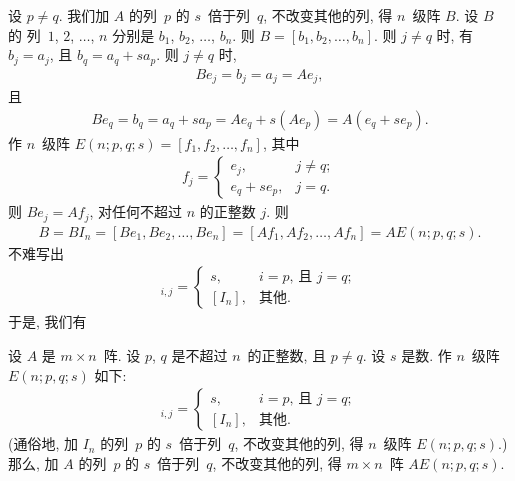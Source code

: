 设 \(p \neq q\).
我们加 \(A\) 的列~\(p\) 的 \(s\)~倍于列~\(q\),
不改变其他的列, 得 \(n\)~级阵 \(B\).
设 \(B\) 的%
列~\(1\), \(2\), \(\dots\), \(n\) 分别是
\(b_1\), \(b_2\), \(\dots\), \(b_n\).
则 \(B = [b_1, b_2, \dots, b_n]\).
则 \(j \neq q\) 时, 有 \(b_j = a_j\),
且 \(b_q = a_q + s a_p\).
则 \(j \neq q\) 时,
\begin{align*}
    B e_j = b_j = a_j = A e_j,
\end{align*}
且
\begin{align*}
    B e_q = b_q = a_q + s a_p = A e_q + s (A e_p) = A (e_q + s e_p).
\end{align*}
作 \(n\)~级阵
\(E(n; p, q; s) = [f_1, f_2, \dots, f_n]\),
其中
\begin{align*}
    f_j
    = \begin{cases}
          e_j,         & j \neq q; \\
          e_q + s e_p, & j = q.
      \end{cases}
\end{align*}
则 \(B e_j = A f_j\),
对任何不超过 \(n\) 的正整数 \(j\).
则
\begin{align*}
    B = BI_n = [B e_1, B e_2, \dots, B e_n]
    = [A f_1, A f_2, \dots, A f_n]
    = A E(n; p, q; s).
\end{align*}
不难写出
\begin{align*}
    [E(n; p, q; s)]_{i,j}
    = \begin{cases}
          s,     & \text{\(i = p\), 且 \(j = q\)}; \\
          [I_n], & \text{其他}.
      \end{cases}
\end{align*}
于是, 我们有

\begin{theorem}
    设 \(A\) 是 \(m \times n\)~阵.
    设 \(p\), \(q\) 是不超过 \(n\)~的正整数,
    且 \(p \neq q\).
    设 \(s\) 是数.
    作 \(n\)~级阵 \(E(n; p, q; s)\) 如下:
    \begin{align*}
        [E(n; p, q; s)]_{i,j}
        = \begin{cases}
              s,     & \text{\(i = p\), 且 \(j = q\)}; \\
              [I_n], & \text{其他}.
          \end{cases}
    \end{align*}
    (通俗地,
    加 \(I_n\) 的列~\(p\) 的 \(s\)~倍于列~\(q\),
    不改变其他的列, 得 \(n\)~级阵 \(E(n; p, q; s)\).)
    那么,
    加 \(A\) 的列~\(p\) 的 \(s\)~倍于列~\(q\),
    不改变其他的列, 得 \(m \times n\)~阵 \(A E(n; p, q; s)\).
\end{theorem}

